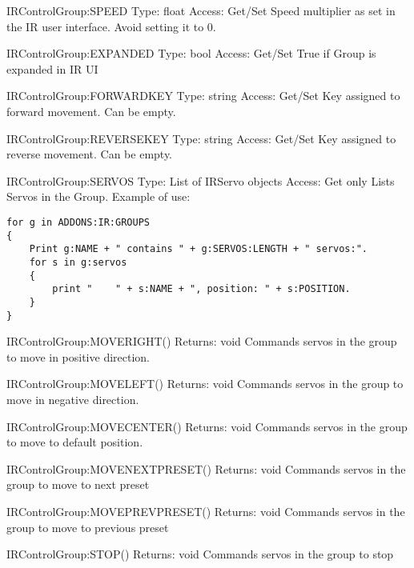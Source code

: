 IRControlGroup:SPEED
Type:	float
Access:	Get/Set
Speed multiplier as set in the IR user interface. Avoid setting it to 0.

IRControlGroup:EXPANDED
Type:	bool
Access:	Get/Set
True if Group is expanded in IR UI

IRControlGroup:FORWARDKEY
Type:	string
Access:	Get/Set
Key assigned to forward movement. Can be empty.

IRControlGroup:REVERSEKEY
Type:	string
Access:	Get/Set
Key assigned to reverse movement. Can be empty.

IRControlGroup:SERVOS
Type:	List of IRServo objects
Access:	Get only
Lists Servos in the Group. Example of use:

\begin{Verbatim}[frame=single]
for g in ADDONS:IR:GROUPS
{
    Print g:NAME + " contains " + g:SERVOS:LENGTH + " servos:".
    for s in g:servos
    {
        print "    " + s:NAME + ", position: " + s:POSITION.
    }
}
\end{Verbatim}

IRControlGroup:MOVERIGHT()
Returns:	void
Commands servos in the group to move in positive direction.

IRControlGroup:MOVELEFT()
Returns:	void
Commands servos in the group to move in negative direction.

IRControlGroup:MOVECENTER()
Returns:	void
Commands servos in the group to move to default position.

IRControlGroup:MOVENEXTPRESET()
Returns:	void
Commands servos in the group to move to next preset

IRControlGroup:MOVEPREVPRESET()
Returns:	void
Commands servos in the group to move to previous preset

IRControlGroup:STOP()
Returns:	void
Commands servos in the group to stop

